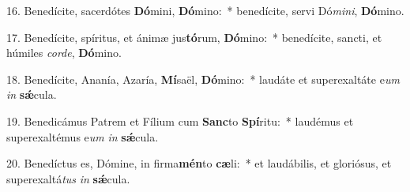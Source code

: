 16. Benedícite, sacerdótes \textbf{Dó}mini, \textbf{Dó}mino:~* benedícite, servi Dó\textit{mi}\textit{ni}, \textbf{Dó}mino.

17. Benedícite, spíritus, et ánimæ jus\textbf{tó}rum, \textbf{Dó}mino:~* benedícite, sancti, et húmiles \textit{cor}\textit{de}, \textbf{Dó}mino.

18. Benedícite, Ananía, Azaría, \textbf{Mí}saël, \textbf{Dó}mino:~* laudáte et superexaltáte e\textit{um} \textit{in} \textbf{s\'{\ae}}cula.

19. Benedicámus Patrem et Fílium cum \textbf{Sanc}to \textbf{Spí}ritu:~* laudémus et superexaltémus e\textit{um} \textit{in} \textbf{s\'{\ae}}cula.

20. Benedíctus es, Dómine, in firma\textbf{mén}to \textbf{cæ}li:~* et laudábilis, et gloriósus, et superexaltá\textit{tus} \textit{in} \textbf{s\'{\ae}}cula.
